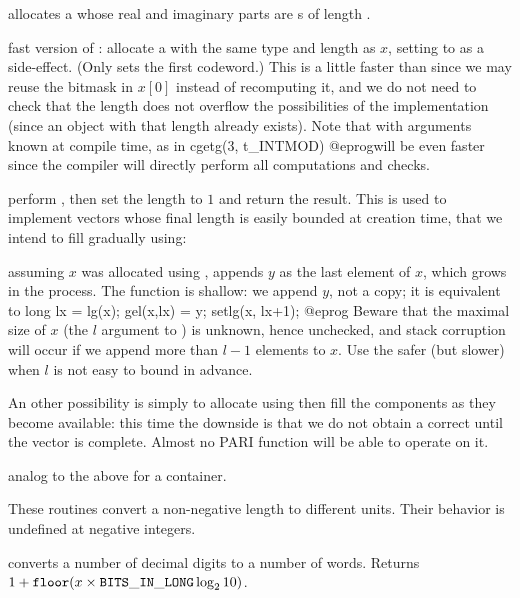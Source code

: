  allocates a  whose real and
imaginary parts are s of length .

 fast version of :
allocate a  with the same type and length as $x$, setting 
to  as a side-effect. (Only sets the first codeword.) This is
a little faster than  since we may reuse the bitmask in
$x[0]$ instead of recomputing it, and we do not need to check that the
length does not overflow the possibilities of the
implementation (since an object with that length already exists). Note that
 with arguments known at compile time, as in
\bprog
  cgetg(3, t_INTMOD)
@eprog\noindent will be even faster since the compiler will directly perform
all computations and checks.

 perform , then
set the length to $1$ and return the result. This is used to  implement
vectors whose final length is easily bounded at creation time, that we intend
to fill gradually using:

 assuming $x$ was allocated using
, appends $y$ as the last element of $x$, which
grows in the process. The function is shallow: we append $y$, not a copy;
it is equivalent to
\bprog
  long lx = lg(x); gel(x,lx) = y; setlg(x, lx+1);
@eprog\noindent
Beware that the maximal size of $x$ (the $l$ argument to )
is unknown, hence unchecked, and stack corruption will occur if we append
more than $l-1$ elements to $x$. Use the safer (but slower)
 when $l$ is not easy to bound in advance.

An other possibility is simply to allocate using  then fill
the components as they become available: this time the downside is that we do
not obtain a correct  until the vector is complete. Almost no PARI
function will be able to operate on it.


 analog to the above for a
 container.


These routines convert a non-negative length to different units. Their
behavior is undefined at negative integers.

 converts a number of decimal digits to a number
of words. Returns $ 1 + {\tt floor}(x \times {\tt BITS\_IN\_LONG} \log_2 10)$.

